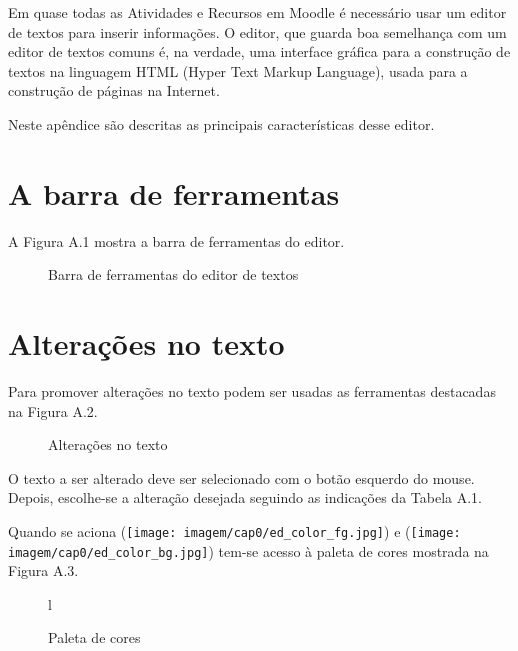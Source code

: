 Em quase todas as Atividades e Recursos em Moodle é necessário usar um editor de textos para inserir informações. O editor, que guarda boa semelhança com um editor de textos comuns é, na verdade, uma interface gráfica para a construção de textos na linguagem HTML (Hyper Text Markup Language), usada para a construção de páginas na Internet.

Neste apêndice são descritas as principais características desse editor.

\section{A barra de ferramentas}


A Figura A.1 mostra a barra de ferramentas do editor.

\begin{figure}
 \begin{center}
  \caption{Barra de ferramentas do editor de textos}
 \end{center}
\end{figure}

\section{Alterações no texto}


Para promover alterações no texto podem ser usadas as ferramentas destacadas na Figura A.2.

\begin{figure}
 \begin{center}
  \caption{Alterações no texto}
 \end{center}
\end{figure}

O texto a ser alterado deve ser selecionado com o botão esquerdo do mouse. Depois, escolhe-se a alteração desejada seguindo as indicações da Tabela A.1.

Quando se aciona (\texttt{[image: imagem/cap0/ed\_color\_fg.jpg]}) e 
(\texttt{[image: imagem/cap0/ed\_color\_bg.jpg]}) tem-se acesso à paleta de cores mostrada na Figura A.3.

\begin{figure}{l}
 \begin{center}
  \caption{Paleta de cores}
 \end{center}
\end{figure}

